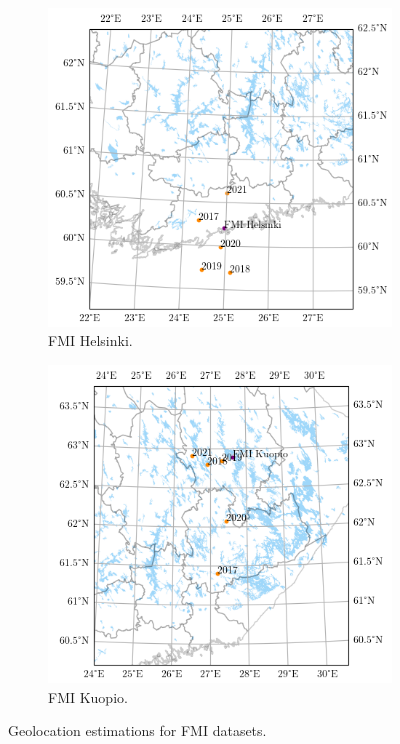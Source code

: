 \begin{figure}[h]
	
     \centering
     \begin{subfigure}[b]{0.45\textwidth}
         \centering
         \includegraphics[width=\textwidth]{pics/geolocationmap2}
         \caption{FMI Helsinki.}
         \label{fig_geolocationhelsinki}
     \end{subfigure}
     \hfill
     \begin{subfigure}[b]{0.45\textwidth}
         \centering
         \includegraphics[width=\textwidth]{pics/geolocationmap3}
         \caption{FMI Kuopio.}
         
         \label{fig_geolocationkuopio}
     \end{subfigure}
     \hfill
     \caption{Geolocation estimations for FMI datasets.}
     \label{fig_anglespace}
\end{figure}

